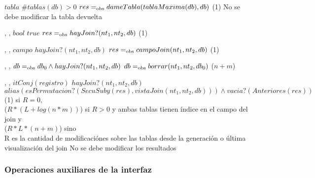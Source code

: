 {   }
{$tabla$}
{$\#tablas(db) > 0$}
{$res =_{\mathrm{obs}} dameTabla(tablaMaxima(db),db)$}
{\bigo(1)}
{No se debe modificar la tabla devuelta}
{}

{   ,
    ,
    }
{$bool$}
{$true$}
{$res =_{\mathrm{obs}} hayJoin?(nt_1,nt_2,db)$}
{\bigo(1)}
{}
{}

{   ,
    ,
    }
{$campo$}
{$hayJoin?(nt_1,nt_2,db)$}
{$res =_{\mathrm{obs}} campoJoin(nt_1,nt_2,db)$}
{\bigo(1)}
{}
{}

{   ,
    ,
    }
{}
{$db =_{\mathrm{obs}} db_0 \land hayJoin?(nt_1,nt_2,db)$}
{$db =_{\mathrm{obs}} borrar(nt_1,nt_2,db_0)$}
{\bigo($n + m$)}
{}
{}

{   ,
    ,
    }
{$itConj(registro)$}
{$hayJoin?(nt_1,nt_2,db)$}
{$alias(esPermutacion?(SecuSuby(res), vistaJoin(nt_1, nt_2, db))) \land vacia?(Anteriores(res))$}
{\bigo(1) si $R = 0$, \\
    \hspace*{4em} \bigo($R * (L + log(n * m))$) si $R > 0$ y ambas tablas tienen índice en el campo del join y \\
    \hspace*{4em} \bigo($R * L * (n + m)$) sino \\
    \hspace*{4em} R es la cantidad de modificaciónes sobre las tablas desde la generación o última visualización del join}
{No se debe modificar los resultados}
{}

\subsubsection{Operaciones auxiliares de la interfaz}




